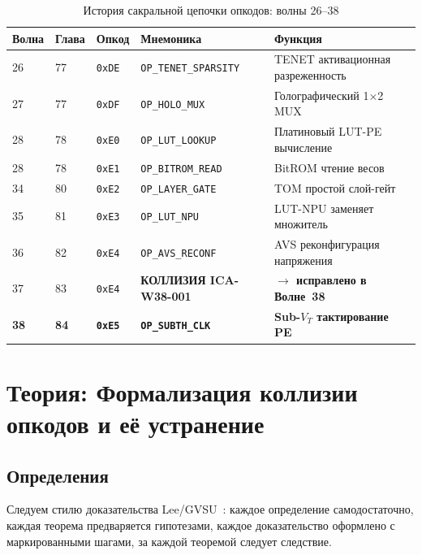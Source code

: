 \begin{table}[ht]
\centering
\caption{История сакральной цепочки опкодов: волны 26--38}
\label{tab:prior_work_position}
\begin{tabular}{lllll}
\hline
Волна & Глава & Опкод & Мнемоника & Функция \\
\hline
26 & 77 & \texttt{0xDE} & \texttt{OP\_TENET\_SPARSITY}  & TENET активационная разреженность \\
27 & 77 & \texttt{0xDF} & \texttt{OP\_HOLO\_MUX}        & Голографический 1$\times$2 MUX \\
28 & 78 & \texttt{0xE0} & \texttt{OP\_LUT\_LOOKUP}       & Платиновый LUT-PE вычисление \\
28 & 78 & \texttt{0xE1} & \texttt{OP\_BITROM\_READ}      & BitROM чтение весов \\
34 & 80 & \texttt{0xE2} & \texttt{OP\_LAYER\_GATE}       & TOM простой слой-гейт \\
35 & 81 & \texttt{0xE3} & \texttt{OP\_LUT\_NPU}          & LUT-NPU заменяет множитель \\
36 & 82 & \texttt{0xE4} & \texttt{OP\_AVS\_RECONF}       & AVS реконфигурация напряжения \\
37 & 83 & \texttt{0xE4} & \textbf{КОЛЛИЗИЯ ICA-W38-001}  & \textbf{$\to$ исправлено в Волне~38} \\
\textbf{38} & \textbf{84} & \textbf{\texttt{0xE5}} &
  \textbf{\texttt{OP\_SUBTH\_CLK}} & \textbf{Sub-$V_T$ тактирование PE} \\
\hline
\end{tabular}
\end{table}

\section{Теория: Формализация коллизии опкодов и её устранение}
\label{sec:theory}

\subsection{Определения}

Следуем стилю доказательства Lee/GVSU~\cite{lee_intro_topology}:
каждое определение самодостаточно, каждая теорема предваряется
гипотезами, каждое доказательство оформлено с маркированными шагами,
за каждой теоремой следует следствие.

